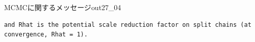 \begin{Rscreen}{MCMCに関するメッセージ}{out27_04}
	\begin{verbatim}
and Rhat is the potential scale reduction factor on split chains (at convergence, Rhat = 1).
\end{verbatim}
\end{Rscreen}
